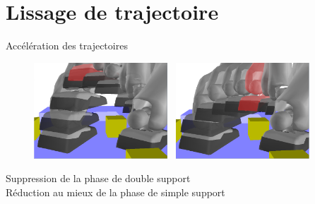 \documentclass{beamer}
\begin{document}
\begin{frame}
\begin{tiny}
\begin{figure}
    \end{figure}
  \end{tiny}
\end{frame}

\section{Lissage de trajectoire}
\begin{frame}
  \begin{center} 
    Accélération des trajectoires
    \begin{figure}
      \includegraphics[width=5cm]{./images/smoothing_before.png}~
      \includegraphics[width=5cm]{./images/smoothing_after.png}
    \end{figure}
    
    Suppression de la phase de double support\\
    Réduction au mieux de la phase de simple support
  \end{center}
\end{frame}
\end{document}
